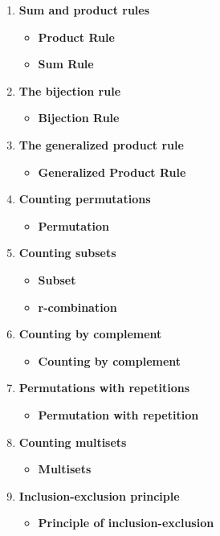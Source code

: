 \documentclass[12pt,a4paper]{article}
\begin{document}
\clearpage
\begin{center}
  \large\textsc{}
\end{center}
\begin{enumerate}
  \item \textbf{Sum and product rules}
  \begin{itemize}
    \item \textbf{Product Rule}
    \item \textbf{Sum Rule}
  \end{itemize}
  \item \textbf{The bijection rule}
  \begin{itemize}
    \item \textbf{Bijection Rule}
  \end{itemize}
  \item \textbf{The generalized product rule}
  \begin{itemize}
    \item \textbf{Generalized Product Rule}
  \end{itemize}
  \item \textbf{Counting permutations}
  \begin{itemize}
    \item \textbf{Permutation}
  \end{itemize}
  \item \textbf{Counting subsets}
  \begin{itemize}
    \item \textbf{Subset}
    \item \textbf{r-combination}
  \end{itemize}
  \item \textbf{Counting by complement}
  \begin{itemize}
    \item \textbf{Counting by complement}
  \end{itemize}
  \item \textbf{Permutations with repetitions}
  \begin{itemize}
    \item \textbf{Permutation with repetition}
  \end{itemize}
  \item \textbf{Counting multisets}
  \begin{itemize}
    \item \textbf{Multisets}
  \end{itemize}
  \item \textbf{Inclusion-exclusion principle}
  \begin{itemize}
    \item \textbf{Principle of inclusion-exclusion}
  \end{itemize}
\end{enumerate}
\end{document}
